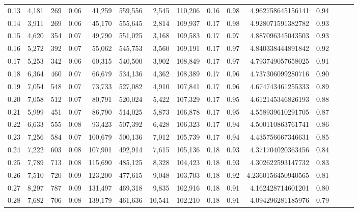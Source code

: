 \begin{tabular}{rrrrrrrrrrrrrrr}
0.13 &   4,181 &    269 &  0.06 &   41,259 &  559,556 &    2,545 &  110,206 &  0.16 &  0.98 &     4.962758645156141 &      0.94 \\
0.14 &   3,911 &    269 &  0.06 &   45,170 &  555,645 &    2,814 &  109,937 &  0.17 &  0.98 &     4.928071591382782 &      0.93 \\
0.15 &   4,620 &    354 &  0.07 &   49,790 &  551,025 &    3,168 &  109,583 &  0.17 &  0.97 &     4.887096345043503 &      0.93 \\
0.16 &   5,272 &    392 &  0.07 &   55,062 &  545,753 &    3,560 &  109,191 &  0.17 &  0.97 &     4.840338444891842 &      0.92 \\
0.17 &   5,253 &    342 &  0.06 &   60,315 &  540,500 &    3,902 &  108,849 &  0.17 &  0.97 &     4.793749057658025 &      0.91 \\
0.18 &   6,364 &    460 &  0.07 &   66,679 &  534,136 &    4,362 &  108,389 &  0.17 &  0.96 &     4.737306099280716 &      0.90 \\
0.19 &   7,054 &    548 &  0.07 &   73,733 &  527,082 &    4,910 &  107,841 &  0.17 &  0.96 &     4.674743461255333 &      0.89 \\
0.20 &   7,058 &    512 &  0.07 &   80,791 &  520,024 &    5,422 &  107,329 &  0.17 &  0.95 &     4.612145346826193 &      0.88 \\
0.21 &   5,999 &    451 &  0.07 &   86,790 &  514,025 &    5,873 &  106,878 &  0.17 &  0.95 &     4.558939610291705 &      0.87 \\
0.22 &   6,633 &    555 &  0.08 &   93,423 &  507,392 &    6,428 &  106,323 &  0.17 &  0.94 &     4.500110863761741 &      0.86 \\
0.23 &   7,256 &    584 &  0.07 &  100,679 &  500,136 &    7,012 &  105,739 &  0.17 &  0.94 &     4.435756667346631 &      0.85 \\
0.24 &   7,222 &    603 &  0.08 &  107,901 &  492,914 &    7,615 &  105,136 &  0.18 &  0.93 &     4.371704020363456 &      0.84 \\
0.25 &   7,789 &    713 &  0.08 &  115,690 &  485,125 &    8,328 &  104,423 &  0.18 &  0.93 &     4.302622593147732 &      0.83 \\
0.26 &   7,510 &    720 &  0.09 &  123,200 &  477,615 &    9,048 &  103,703 &  0.18 &  0.92 &    4.2360156450940565 &      0.81 \\
0.27 &   8,297 &    787 &  0.09 &  131,497 &  469,318 &    9,835 &  102,916 &  0.18 &  0.91 &     4.162428714601201 &      0.80 \\
0.28 &   7,682 &    706 &  0.08 &  139,179 &  461,636 &   10,541 &  102,210 &  0.18 &  0.91 &     4.094296281185976 &      0.79 \\

\end{tabular}
